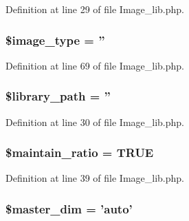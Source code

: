 Definition at line 29 of file Image\-\_\-lib.\-php.

\hypertarget{class_c_i___image__lib_a939d6733d998cce893403d2f59f40317}{
\subsubsection[{\$image\-\_\-type}]{\setlength{\rightskip}{0pt plus 5cm}\$image\-\_\-type = ''}}\label{class_c_i___image__lib_a939d6733d998cce893403d2f59f40317}


Definition at line 69 of file Image\-\_\-lib.\-php.

\hypertarget{class_c_i___image__lib_ac09f7fc802884aae2149f1df0e53f17a}{
\subsubsection[{\$library\-\_\-path}]{\setlength{\rightskip}{0pt plus 5cm}\$library\-\_\-path = ''}}\label{class_c_i___image__lib_ac09f7fc802884aae2149f1df0e53f17a}


Definition at line 30 of file Image\-\_\-lib.\-php.

\hypertarget{class_c_i___image__lib_a7fe1beb3e7d60245c97c60ee4b668d93}{
\subsubsection[{\$maintain\-\_\-ratio}]{\setlength{\rightskip}{0pt plus 5cm}\$maintain\-\_\-ratio = T\-R\-U\-E}}\label{class_c_i___image__lib_a7fe1beb3e7d60245c97c60ee4b668d93}


Definition at line 39 of file Image\-\_\-lib.\-php.

\hypertarget{class_c_i___image__lib_ae86c3d7ce316cc0c48a8dcba8ae4130d}{
\subsubsection[{\$master\-\_\-dim}]{\setlength{\rightskip}{0pt plus 5cm}\$master\-\_\-dim = 'auto'}}\label{class_c_i___image__lib_ae86c3d7ce316cc0c48a8dcba8ae4130d}


